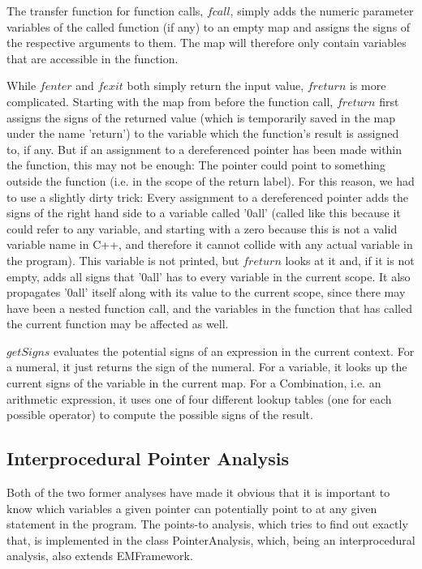 \documentclass[a4paper,11pt]{article}
\begin{document}
The transfer function for function calls, $fcall$, simply adds the numeric parameter variables of the called function (if any) to an empty map and assigns the signs of the respective arguments to them. The map will therefore only contain variables that are accessible in the function.

While $fenter$ and $fexit$ both simply return the input value, $freturn$ is more complicated. Starting with the map from before the function call, $freturn$ first assigns the signs of the returned value (which is temporarily saved in the map under the name 'return') to the variable which the function's result is assigned to, if any. But if an assignment to a dereferenced pointer has been made within the function, this may not be enough: The pointer could point to something outside the function (i.e. in the scope of the return label). For this reason, we had to use a slightly dirty trick: Every assignment to a dereferenced pointer adds the signs of the right hand side to a variable called '0all' (called like this because it could refer to any variable, and starting with a zero because this is not a valid variable name in C++, and therefore it cannot collide with any actual variable in the program). This variable is not printed, but $freturn$ looks at it and, if it is not empty, adds all signs that '0all' has to every variable in the current scope. It also propagates '0all' itself along with its value to the current scope, since there may have been a nested function call, and the variables in the function that has called the current function may be affected as well.

$getSigns$ evaluates the potential signs of an expression in the current context. For a numeral, it just returns the sign of the numeral. For a variable, it looks up the current signs of the variable in the current map. For a Combination, i.e. an arithmetic expression, it uses one of four different lookup tables (one for each possible operator) to compute the possible signs of the result.

\subsection{Interprocedural Pointer Analysis}
Both of the two former analyses have made it obvious that it is important to know which variables a given pointer can potentially point to at any given statement in the program. The points-to analysis, which tries to find out exactly that, is implemented in the class PointerAnalysis, which, being an interprocedural analysis, also extends EMFramework. 
\end{document}
